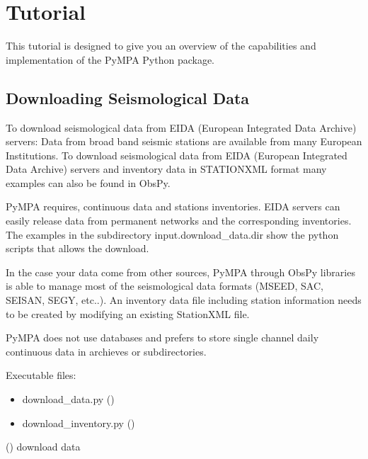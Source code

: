\documentclass[a4paper,12pt,english]{sphinxmanual}
\begin{document}
\chapter{Tutorial}
\label{\detokenize{tutorial:tutorial}}\label{\detokenize{tutorial::doc}}
This tutorial is designed to give you an overview of the capabilities and
implementation of the PyMPA Python package.


\section{Downloading Seismological Data}
\label{\detokenize{tutorial:downloading-seismological-data}}
To download seismological data from EIDA (European Integrated Data Archive) servers:
Data from broad band seismic stations are available
from many European Institutions. To download seismological data from EIDA (European Integrated Data Archive) servers
and inventory data in STATIONXML format many examples can also be found in ObsPy.

PyMPA requires, continuous data and stations inventories.
EIDA servers can easily release data from permanent networks and the corresponding
inventories. The examples in the subdirectory input.download\_data.dir show the python scripts
that allows the download.

In the case your data come from other sources, PyMPA through ObsPy libraries
is able to manage most of the seismological data formats (MSEED, SAC, SEISAN, SEGY, etc..).
An inventory data file including station information needs to be created by modifying an existing
StationXML file.

PyMPA does not use databases and prefers to store single channel daily continuous data in archieves or subdirectories.

Executable files:
\begin{itemize}
\item {} 
download\_data.py ()

\item {} 
download\_inventory.py ()

\end{itemize}

({\hyperref[\detokenize{sub/input.download_data::doc}]{}}) download data
\end{document}
